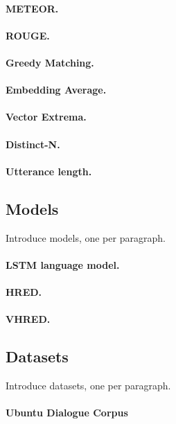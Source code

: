 \documentclass[runningheads]{llncs}
\begin{document}
\paragraph{METEOR.}
\paragraph{ROUGE.}

\paragraph{Greedy Matching.}
\paragraph{Embedding Average.}
\paragraph{Vector Extrema.}

\paragraph{Distinct-N.}
\paragraph{Utterance length.}

\subsection{Models}
Introduce models, one per paragraph.
\paragraph{LSTM language model.}
\paragraph{HRED.}
\paragraph{VHRED.}

\subsection{Datasets}
Introduce datasets, one per paragraph.
\paragraph{Ubuntu Dialogue Corpus}
\end{document}
